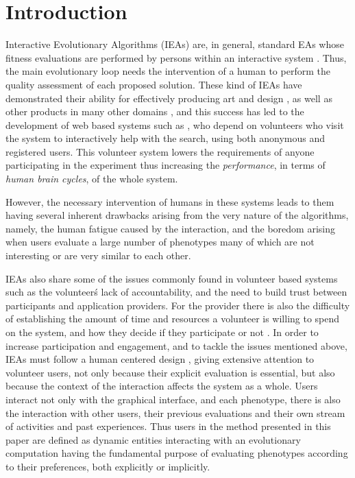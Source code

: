 \documentclass[conference]{IEEEtran}
\begin{document}
\section{Introduction}
Interactive Evolutionary Algorithms (IEAs) are, in general, standard EAs whose
fitness evaluations are performed by persons within an interactive 
system \cite{eiben2015interactive}.  Thus, the main evolutionary loop needs the intervention of a
human to perform the quality assessment of each proposed solution.
These kind of IEAs have demonstrated their ability for effectively
producing art and design \cite{Bentley:1999:intro,Sims:1991,todd:1992},
as well as other products in many other domains \cite{ie1}, and this
success has led to the development of web based systems such as \cite{picbreeder},
who depend on volunteers who visit the system to interactively help
with the search, using both anonymous and registered users. This
volunteer system lowers the requirements of anyone participating in
the experiment thus increasing the {\em performance}, in terms of {\em
  human brain cycles}, of the whole system.


However, the necessary intervention of humans in these systems leads
to them having several inherent drawbacks arising from the very nature of 
the algorithms, namely, the human fatigue caused by the interaction, and
the boredom arising when users evaluate a large number of phenotypes 
many of which are not interesting or are very similar to each other.


IEAs also share some of the issues commonly found in volunteer based systems
\cite{sarmenta2001volunteer,web:BOINC} such as the volunteer\'s lack of accountability,
and the need to build trust between participants and application providers. 
For the provider there is also the difficulty of establishing 
the amount of time and resources
a volunteer is willing to spend on the system, and how they decide if they
participate or not \cite{JJ:2016}. In order to increase participation and 
engagement, and to tackle the issues mentioned above,  
IEAs must follow a human centered design \cite{greenhouse2012human}, %
giving extensive attention 
to volunteer users, not only because their
explicit evaluation is essential, but also because the context of the 
interaction affects the system as a whole. Users interact not only with the graphical
interface, and each phenotype, there is also the interaction
with other users, their previous evaluations and their own stream of activities
and past experiences. Thus users in the method presented in this paper are defined as dynamic entities 
interacting with an evolutionary computation having the fundamental purpose 
of evaluating phenotypes according to their preferences,
both explicitly or implicitly. 
\end{document}
